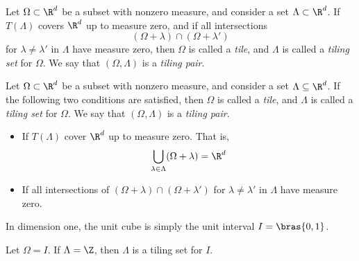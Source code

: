\begin{definition}
    Let $\Omega \subset \R^d$ be a subset with nonzero measure, and consider a set $\Lambda \subset \R^d$. If $T(\Lambda)$ covers $\R^d$ up to measure zero, and if all intersections 
    \begin{equation*}  %
        (\Omega+\lambda) \cap (\Omega+\lambda')
    \end{equation*}
    for $\lambda\neq \lambda'$ in $\Lambda$ have measure zero, then $\Omega$ is called a \emph{tile}, and $\Lambda$ is called a \emph{tiling set} for $\Omega$. We say that $(\Omega, \Lambda)$ is a \emph{tiling pair}. 
\end{definition}
\begin{definition}  %
    Let $\Omega \subset \R^d$ be a subset with nonzero measure, and consider a set $\Lambda \subseteq \R^d$. If the following two conditions are satisfied, then $\Omega$ is called a \emph{tile}, and $\Lambda$ is called a \emph{tiling set} for $\Omega$. We say that $(\Omega, \Lambda)$ is a \emph{tiling pair}. 
    \begin{itemize}
        \item If $T(\Lambda)$ cover $\R^d$ up to measure zero. That is,  %
        \begin{equation*}
            \bigcup_{\lambda \in \Lambda} (\Omega + \lambda) = \R^d
        \end{equation*}
        \item If all intersections of $(\Omega+\lambda) \cap (\Omega+\lambda')$ for $\lambda\neq \lambda'$ in $\Lambda$ have measure zero. %
    \end{itemize}
\end{definition}


In dimension one, the unit cube is simply the unit interval $I=\bras{0,1}$.
\begin{theorem}  %
    Let $\Omega = I$. If $\Lambda=\Z$, then $\Lambda$ is a tiling set for $I$.
\end{theorem}

